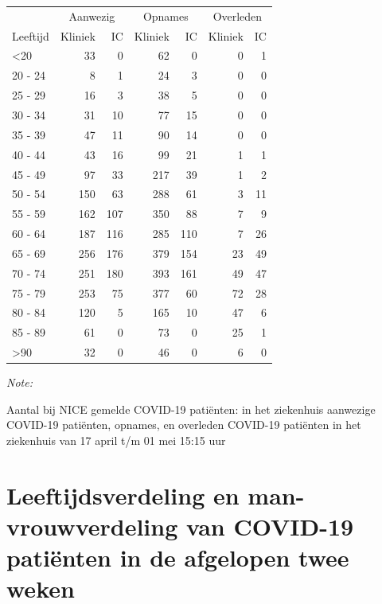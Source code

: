 \documentclass[
  english,
  man,floatsintext]{apa6}
\begin{document}
\begin{table}
\centering\begingroup\fontsize{10}{12}\selectfont

\begin{threeparttable}
\begin{tabular}{lrrrrrr}
\toprule
\multicolumn{1}{c}{ } & \multicolumn{2}{c}{Aanwezig} & \multicolumn{2}{c}{Opnames} & \multicolumn{2}{c}{Overleden} \\
\cmidrule(l{3pt}r{3pt}){2-3} \cmidrule(l{3pt}r{3pt}){4-5} \cmidrule(l{3pt}r{3pt}){6-7}
Leeftijd & Kliniek & IC & Kliniek & IC & Kliniek & IC\\
\midrule
<20 & 33 & 0 & 62 & 0 & 0 & 1\\
20 - 24 & 8 & 1 & 24 & 3 & 0 & 0\\
25 - 29 & 16 & 3 & 38 & 5 & 0 & 0\\
30 - 34 & 31 & 10 & 77 & 15 & 0 & 0\\
35 - 39 & 47 & 11 & 90 & 14 & 0 & 0\\
40 - 44 & 43 & 16 & 99 & 21 & 1 & 1\\
45 - 49 & 97 & 33 & 217 & 39 & 1 & 2\\
50 - 54 & 150 & 63 & 288 & 61 & 3 & 11\\
55 - 59 & 162 & 107 & 350 & 88 & 7 & 9\\
60 - 64 & 187 & 116 & 285 & 110 & 7 & 26\\
65 - 69 & 256 & 176 & 379 & 154 & 23 & 49\\
70 - 74 & 251 & 180 & 393 & 161 & 49 & 47\\
75 - 79 & 253 & 75 & 377 & 60 & 72 & 28\\
80 - 84 & 120 & 5 & 165 & 10 & 47 & 6\\
85 - 89 & 61 & 0 & 73 & 0 & 25 & 1\\
>90 & 32 & 0 & 46 & 0 & 6 & 0\\
\bottomrule
\end{tabular}
\begin{tablenotes}
\item \textit{Note: } 
\item Aantal bij NICE gemelde COVID-19 patiënten: in het ziekenhuis aanwezige COVID-19 patiënten, opnames, en overleden COVID-19 patiënten in het ziekenhuis van 17 april t/m 01 mei 15:15 uur
\end{tablenotes}
\end{threeparttable}
\endgroup{}
\end{table}

\newpage

\hypertarget{leeftijdsverdeling-en-man-vrouwverdeling-van-covid-19-patiuxebnten-in-de-afgelopen-twee-weken}{%
\section{Leeftijdsverdeling en man-vrouwverdeling van COVID-19 patiënten in de afgelopen twee weken}\label{leeftijdsverdeling-en-man-vrouwverdeling-van-covid-19-patiuxebnten-in-de-afgelopen-twee-weken}}
\end{document}
